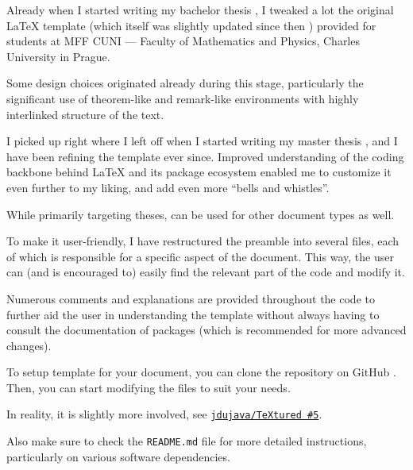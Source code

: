  \label{ch:Introduction}

Already when I started writing my bachelor thesis \autocite{Dujava2022}, I tweaked a lot the original \LaTeX{} template (which itself was slightly updated since then \autocite{MaresTemplate}) provided for students at MFF CUNI --- Faculty of Mathematics and Physics, Charles University in Prague.

Some design choices originated already during this stage, particularly the significant use of theorem-like and remark-like environments with highly interlinked structure of the text.

I picked up right where I left off when I started writing my master thesis \autocite{TODO}, and I have been refining the template ever since.
Improved understanding of the coding backbone behind \LaTeX{} and its package ecosystem enabled me to customize it even further to my liking, and add even more \enquote{bells and whistles}.

\begin{remark}
    While primarily targeting theses, \TeXtured{} can be used for other document types as well.
\end{remark}

To make it user-friendly, I have restructured the preamble into several files, each of which is responsible for a specific aspect of the document.
This way, the user can (and is encouraged to) easily find the relevant part of the code and modify it.

Numerous comments and explanations are provided throughout the code to further aid the user in understanding the template without always having to consult the documentation of packages (which is recommended for more advanced changes).

\begin{remark}
    To setup \TeXtured{} template for your document, you can clone the repository on GitHub \autocite{TeXtured}.
    Then, you can start modifying the files to suit your needs.
    \begin{Note}
        In reality, it is slightly more involved, see \href{https://github.com/jdujava/TeXtured/issues/5}{\texttt{jdujava/TeXtured \#5}}.
    \end{Note}
    Also make sure to check the \texttt{README.md} file for more detailed instructions, particularly on various software dependencies.
\end{remark}

